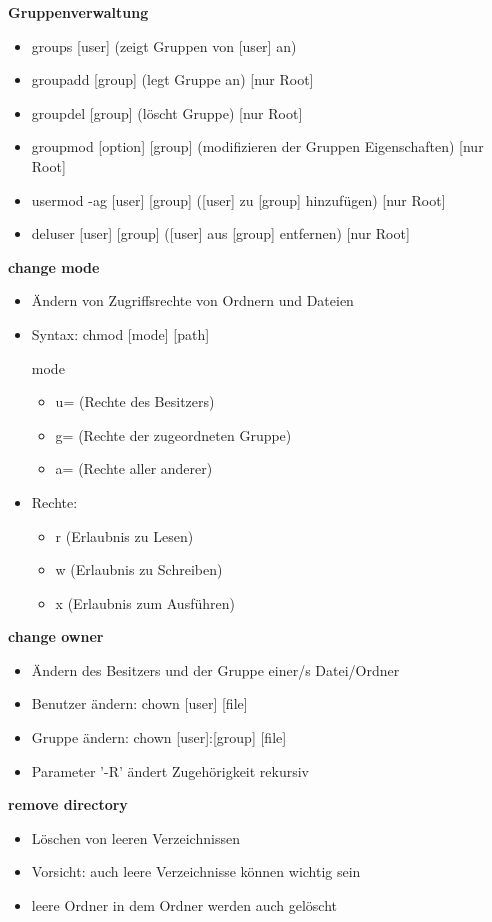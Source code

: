 \documentclass[12pt,utf8, 10pt]{article}
\begin{document}
\textbf{Gruppenverwaltung}
\begin{itemize}
	\item groups [user] (zeigt Gruppen von [user] an)
	\item groupadd [group] (legt Gruppe an) [nur Root]
	\item groupdel [group] (löscht Gruppe)  [nur Root]
	\item groupmod [option] [group] (modifizieren der Gruppen Eigenschaften) [nur Root]
	\item usermod -ag [user] [group] ([user] zu [group] hinzufügen) [nur Root]
	\item deluser [user] [group] ([user] aus [group] entfernen) [nur Root]
\end{itemize}

\textbf{change mode}
\begin{itemize}
	\item Ändern von Zugriffsrechte von Ordnern und Dateien
	\item Syntax: chmod [mode] [path]
	\item [mode]
	\begin{itemize}
		\item u= (Rechte des Besitzers)
		\item g= (Rechte der zugeordneten Gruppe)
		\item a= (Rechte aller anderer)
	\end{itemize}	 
	\item Rechte:
	\begin{itemize}
		\item r (Erlaubnis zu Lesen)
		\item w (Erlaubnis zu Schreiben)
		\item x (Erlaubnis zum Ausführen)
	\end{itemize}
\end{itemize}

\textbf{change owner}
\begin{itemize}
	\item Ändern des Besitzers und der Gruppe einer/s Datei/Ordner
	\item Benutzer ändern: chown [user] [file]
	\item Gruppe ändern: chown [user]:[group] [file]
	\item Parameter '-R' ändert Zugehörigkeit rekursiv
\end{itemize}

\textbf{remove directory}
\begin{itemize}
	\item Löschen von leeren Verzeichnissen
	\item Vorsicht: auch leere Verzeichnisse können wichtig sein
	\item leere Ordner in dem Ordner werden auch gelöscht
\end{itemize}
\end{document}
